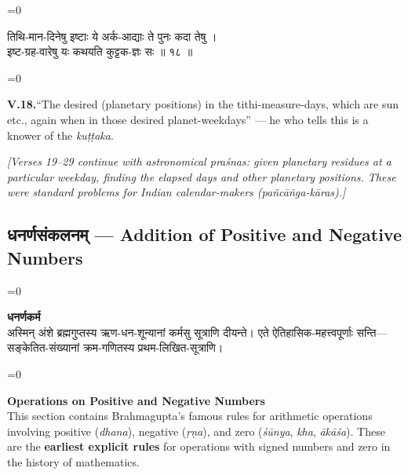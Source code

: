 \documentclass[11pt,a4paper]{article}
\newcommand{\cnote}[1]{\textcolor{notecolor}{\textit{#1}}}
\newcommand{\dev}[1]{{\devanagarifont\color{sktcolor}#1}}
\newcommand{\iast}[1]{\textit{#1}}
\newenvironment{paracol}[1]{\begingroup}{\endgroup}
\newcommand{\switchcolumn}[1][]{%
  \ifnum#1=0\relax\else\par\nobreak\vspace{0.5em}\par\nobreak\fi%
}
\begin{document}
\vspace{0.3cm}

\begin{paracol}{2}
\switchcolumn[0]
\dev{%
तिथि-मान-दिनेषु इष्टाः ये अर्क-आद्याः ते पुनः कदा तेषु ।\\
इष्ट-ग्रह-वारेषु यः कथयति कुट्टक-ज्ञः सः ॥ १८ ॥
}

\switchcolumn[1]
\textbf{V.18.}\quad ``The desired (planetary positions) in the
tithi-measure-days, which are sun etc., again when in those
desired planet-weekdays'' — he who tells this is a knower of the
\iast{kuṭṭaka}.
\end{paracol}

\vspace{0.5cm}
\cnote{[Verses 19–29 continue with astronomical \iast{praśna}s: given
planetary residues at a particular weekday, finding the elapsed
days and other planetary positions. These were standard problems
for Indian calendar-makers (\iast{pañcāṅga-kāra}s).]}

\newpage

\subsection*{\dev{धनर्णसंकलनम् — Addition of Positive and Negative Numbers}}

\begin{paracol}{2}
\switchcolumn[0]
\dev{%
\textbf{धनर्णकर्म}\\[0.2cm]
अस्मिन् अंशे ब्रह्मगुप्तस्य ऋण-धन-शून्यानां कर्मसु
सूत्राणि दीयन्ते। एते ऐतिहासिक-महत्त्वपूर्णाः सन्ति—
सङ्केतित-संख्यानां क्रम-गणितस्य प्रथम-लिखित-सूत्राणि।
}

\switchcolumn[1]
\textbf{Operations on Positive and Negative Numbers}\\[0.2cm]
This section contains Brahmagupta's famous rules for arithmetic
operations involving positive (\iast{dhana}), negative
(\iast{ṛṇa}), and zero (\iast{śūnya}, \iast{kha}, \iast{ākāśa}).
These are the \textbf{earliest explicit rules} for operations
with signed numbers and zero in the history of mathematics.
\end{paracol}

\vspace{0.5cm}
\end{document}
